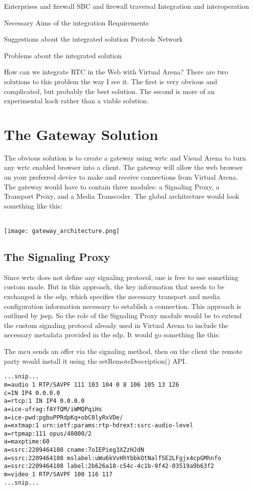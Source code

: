 

Enterprises and firewall
SBC and firewall traversal
Integration and interoperation

Necessary
Aims of the integration
Requirements


Suggestions about the integrated solution
Protcols
Network

Problems about the integrated solution


How can we integrate RTC in the Web with Virtual Arena?
There are two solutions to this problem the way I see it. The first is very obvious and complicated, but probably the best solution. The second is more of an experimental hack rather than a viable solution.

\section{The Gateway Solution}
The obvious solution is to create a gateway using \gls{wrtc} and Visual Arena to turn any \gls{wrtc} enabled browser into a client. The gateway will allow the web browser on your preferred device to make and receive connections from Virtual Arena. The gateway would have to contain three modules:
a Signaling Proxy, a Transport Proxy, and a Media Transcoder. The global architecture would look something like this:
\\
\\
\centerline{\texttt{[image: gateway\_architecture.png]}}

\subsection{The Signaling Proxy}
Since \gls{wrtc} does not define any signaling protocol, one is free to use something custom made. But in this approach, the key information that needs to be exchanged is the \gls{sdp}, which specifies the necessary transport and media configuration information necessary to establish a connection. This approach is outlined by \gls{jsep}. So the role of the Signaling Proxy module would be to extend the custom signaling protocol already used in Virtual Arena to include the necessary metadata provided in the \gls{sdp}. It would go something lke this:

The \gls{mcu} sends an offer via the signaling method, then on the client the remote party would install it using the setRemoteDescription() API.

\begin{lstlisting}[frame=single]
...snip...
m=audio 1 RTP/SAVPF 111 103 104 0 8 106 105 13 126
c=IN IP4 0.0.0.0
a=rtcp:1 IN IP4 0.0.0.0
a=ice-ufrag:fAYfQM/iWMQPqiHs
a=ice-pwd:pgbuPPRdpKq+obC0lyRxVDe/
a=extmap:1 urn:ietf:params:rtp-hdrext:ssrc-audio-level
a=rtpmap:111 opus/48000/2
a=maxptime:60
a=ssrc:2209464108 cname:7oIEPieg3XZzHJdN
a=ssrc:2209464108 mslabel:uWu6kVvHhYbbkOtNalf5E2LFgjx4cpGMhnfo
a=ssrc:2209464108 label:2b626a18-c54c-4c1b-9f42-03519a9b63f2
m=video 1 RTP/SAVPF 100 116 117
...snip...
\end{lstlisting}

